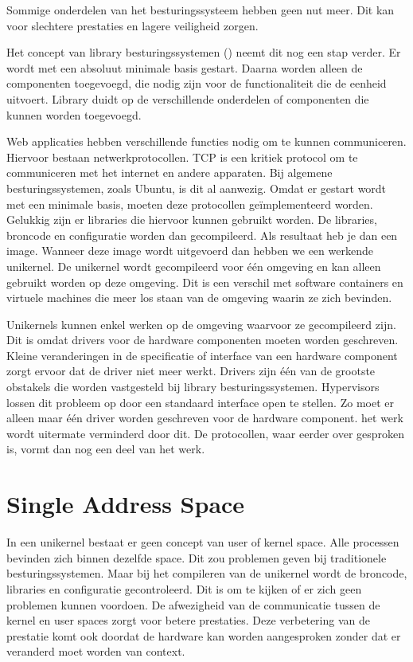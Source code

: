 Sommige onderdelen van het besturingssysteem hebben geen nut meer. Dit kan voor slechtere prestaties en lagere veiligheid zorgen.

Het concept van library besturingssystemen (\cite{madhavapeddy_unikernels_2013}) neemt dit nog een stap verder. Er wordt met een absoluut minimale basis gestart. Daarna worden alleen de componenten toegevoegd, die nodig zijn voor de functionaliteit die de eenheid uitvoert. Library duidt op de verschillende onderdelen of componenten die kunnen worden toegevoegd.

Web applicaties hebben verschillende functies nodig om te kunnen communiceren. Hiervoor bestaan netwerkprotocollen. TCP is een kritiek protocol om te communiceren met het internet en andere apparaten. Bij algemene besturingssystemen, zoals Ubuntu, is dit al aanwezig. Omdat er gestart wordt met een minimale basis, moeten deze protocollen geïmplementeerd worden. Gelukkig zijn er libraries die hiervoor kunnen gebruikt worden. De libraries, broncode en configuratie worden dan gecompileerd. Als resultaat heb je dan een image. Wanneer deze image wordt uitgevoerd dan hebben we een werkende unikernel. De unikernel wordt gecompileerd voor één omgeving en kan alleen gebruikt worden op deze omgeving. Dit is een verschil met software containers en virtuele machines die meer los staan van de omgeving waarin ze zich bevinden.

Unikernels kunnen enkel werken op de omgeving waarvoor ze gecompileerd zijn. Dit is omdat drivers voor de hardware componenten moeten worden geschreven. Kleine veranderingen in de specificatie of interface van een hardware component zorgt ervoor dat de driver niet meer werkt. Drivers zijn één van de grootste obstakels die worden vastgesteld bij library besturingssystemen. Hypervisors lossen dit probleem op door een standaard interface open te stellen. Zo moet er alleen maar één driver worden geschreven voor de hardware component. het werk wordt uitermate verminderd door dit. De protocollen, waar eerder over gesproken is, vormt dan nog een deel van het werk.

\section{Single Address Space}

In een unikernel bestaat er geen concept van user of kernel space. Alle processen bevinden zich binnen dezelfde space. Dit zou problemen geven bij traditionele besturingssystemen. Maar bij het compileren van de unikernel wordt de broncode, libraries en configuratie gecontroleerd. Dit is om te kijken of er zich geen problemen kunnen voordoen. De afwezigheid van de communicatie tussen de kernel en user spaces zorgt voor betere prestaties. Deze verbetering van de prestatie komt ook doordat de hardware kan worden aangesproken zonder dat er veranderd moet worden van context.

